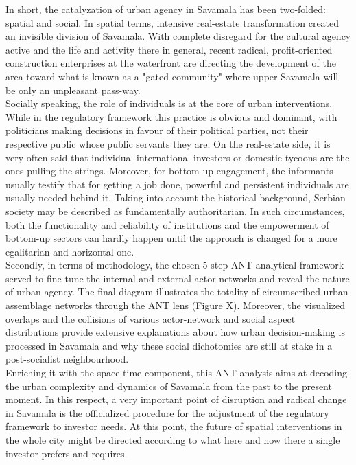 \documentclass[11pt]{report}
\begin{document}
In short, the catalyzation of urban agency in Savamala has been two-folded: spatial and social. In spatial terms, intensive real-estate transformation created an invisible division of Savamala. With complete disregard for the cultural agency active and the life and activity there in general, recent radical, profit-oriented construction enterprises at the waterfront are directing the development of the area toward what is known as a "gated community" where upper Savamala will be only an unpleasant pass-way.
\\

Socially speaking, the role of individuals is at the core of urban interventions. While in the regulatory framework this practice is obvious and dominant, with politicians making decisions in favour of their political parties, not their respective public whose public servants they are. On the real-estate side, it is very often said that individual international investors or domestic tycoons are the ones pulling the strings. Moreover, for bottom-up engagement, the informants usually testify that for getting a job done, powerful and persistent individuals are usually needed behind it. Taking into account the historical background, Serbian society may be described as fundamentally authoritarian. In such circumstances, both the functionality and reliability of institutions and the empowerment of bottom-up sectors can hardly happen until the approach is changed for a more egalitarian and horizontal one. 
\\

Secondly, in terms of methodology, the chosen 5-step ANT analytical framework served to fine-tune the internal and external actor-networks and reveal the nature of urban agency. The final diagram illustrates the totality of circumscribed urban assemblage networks through the ANT lens (\href{ANT diagram}{Figure X}).
Moreover, the visualized overlaps and the collisions of various actor-network and social aspect distributions provide extensive explanations about how urban decision-making is processed in Savamala and why these social dichotomies are still at stake in a post-socialist neighbourhood.
\\

Enriching it with the space-time component, this ANT analysis aims at decoding the urban complexity and dynamics of Savamala from the past to the present moment. In this respect, a very important point of disruption and radical change in Savamala is the officialized procedure for the adjustment of the regulatory framework to investor needs. At this point, the future of spatial interventions in the whole city might be directed according to what here and now there a single investor prefers and requires. 
\\
\end{document}
